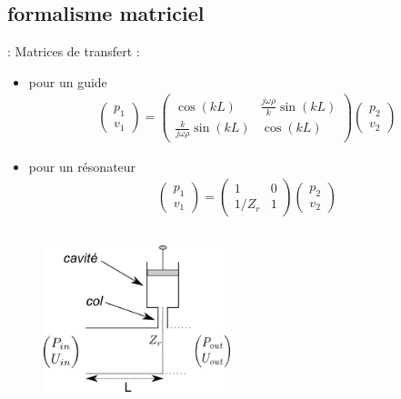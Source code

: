 \documentclass[12pt,xcolor=x11names,compress, notes=show]{beamer}%
\begin{document}
\subsection{formalisme matriciel}
\begin{frame}{\insertsectionhead : \insertsubsectionhead }
Matrices de transfert : 
\begin{itemize}
	\item pour un guide 
	\begin{eqnarray*}
	\begin{pmatrix} p_1 \\ v_1 \end{pmatrix} = \begin{pmatrix} \cos(kL) & \frac{j\omega\rho}{k} \sin(k L) \\  \frac{k}{j\omega\rho}\sin(k L) & \cos(k L) 		\end{pmatrix} 	\begin{pmatrix} p_2 \\ v_2 \end{pmatrix}
	\end{eqnarray*}
	

	\item pour un résonateur
	\begin{eqnarray*}
	\begin{pmatrix} p_1 \\ v_1 \end{pmatrix} = \begin{pmatrix} 1 &  0 \\ 1 /Z_{r} & 1  \end{pmatrix} \begin{pmatrix} p_2 \\ v_2 \end{pmatrix}
	\end{eqnarray*}
\end{itemize}


\vspace{-0.5cm}

\begin{columns}[T]


\begin{figure}
\centering
\includegraphics[width= 0.8\textwidth]{schema_cellule.png}
\end{figure}


\end{columns}
\end{frame}
\end{document}
